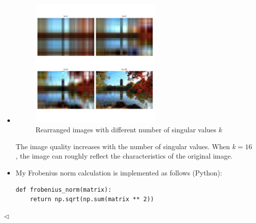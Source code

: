 \documentclass[11pt]{article}
\newenvironment{answer}[1][Answer]{\begin{trivlist}
\item[\hskip \labelsep {\bfseries #1.}\hskip \labelsep]}{\hfill$\lhd$\end{trivlist}}
\begin{document}
\begin{answer} ~
\begin{itemize}
    \item [(1)] 
    
\begin{figure}[h]
    \centering
    \includegraphics[width=0.6\textwidth]{output1.png} 
    \caption{Rearranged images with different number of singular values $k$}
    \label{fig:sample-image} 

\end{figure}
The image quality increases with the number of singular values. When $k=16$, the image can roughly reflect the characteristics of the original image.
\newpage
    \item [(2)] 

My Frobenius norm calculation is implemented as follows (Python):

\begin{lstlisting}
def frobenius_norm(matrix):
    return np.sqrt(np.sum(matrix ** 2))
\end{lstlisting}


\end{itemize}
\end{answer}
\end{document}
